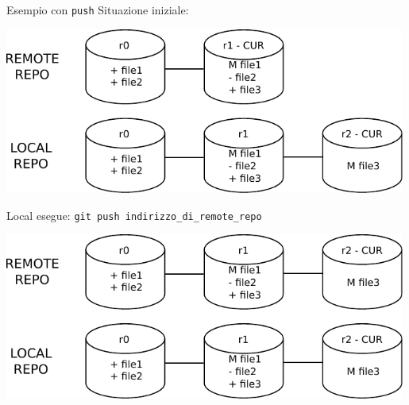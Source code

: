 \documentclass[presentation]{beamer}
\begin{document}
\begin{frame}{Esempio con \texttt{push}}
	Situazione iniziale:
	\begin{center}
		\includegraphics[width=0.99\textwidth]{img/draw5}
	\end{center}
	\framebreak{}
	Local esegue: \texttt{git push indirizzo\_di\_remote\_repo}
	\begin{center}
		\includegraphics[width=0.99\textwidth]{img/draw6}
	\end{center}
\end{frame}
\end{document}
